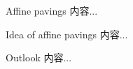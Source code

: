 \documentclass{beamer}
\numberwithin{equation}{section}
\theoremstyle{plain}
\numberwithin{equation}{section}
\theoremstyle{remark}
\begin{document}
\begin{frame}[fragile]{Affine pavings}
内容...
\end{frame}

\begin{frame}[fragile]{Idea of affine pavings}
内容...
\end{frame}

\begin{frame}[fragile]{Outlook}
内容...
\end{frame}
\end{document}
